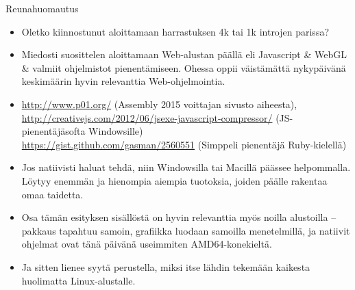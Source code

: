 \documentclass[pdf,10pt,handout]{beamer}
\begin{document}
\begin{frame}{Reunahuomautus}
  \begin{itemize}
    \item Oletko kiinnostunut aloittamaan harrastuksen 4k tai 1k
      introjen parissa?
    \item Miedosti suosittelen aloittamaan Web-alustan päällä eli
      Javascript \& WebGL \& valmiit ohjelmistot
      pienentämiseen. Ohessa oppii väistämättä nykypäivänä keskimäärin
      hyvin relevanttia Web-ohjelmointia.
    \item[]
      {\tiny  \url{http://www.p01.org/} (Assembly 2015 voittajan sivusto aiheesta),\\
      \url{http://creativejs.com/2012/06/jsexe-javascript-compressor/}
      (JS-pienentäjäsofta Windowsille)\\
      \url{https://gist.github.com/gasman/2560551} (Simppeli pienentäjä
      Ruby-kielellä)\\
      }
      
    \item Jos natiivisti haluat tehdä, niin Windowsilla tai Macillä
      päässee helpommalla. Löytyy enemmän ja hienompia aiempia
      tuotoksia, joiden päälle rakentaa omaa taidetta.
    \item Osa tämän esityksen sisällöstä on hyvin relevanttia myös
      noilla alustoilla -- pakkaus tapahtuu samoin, grafiikka luodaan
      samoilla menetelmillä, ja natiivit ohjelmat ovat tänä päivänä
      useimmiten AMD64-konekieltä.
    \item Ja sitten lienee syytä perustella, miksi itse lähdin
      tekemään kaikesta huolimatta Linux-alustalle.
  \end{itemize}
\end{frame}
\end{document}
